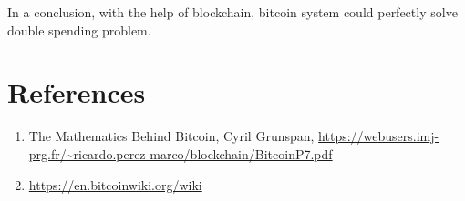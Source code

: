 \documentclass[12pt,a4paper]{article}
\begin{document}
 In a conclusion, with the help of blockchain, bitcoin system could perfectly solve double spending problem.

\section{References}
\begin{enumerate}
	\item The Mathematics Behind Bitcoin, Cyril Grunspan, \url{https://webusers.imj-prg.fr/~ricardo.perez-marco/blockchain/BitcoinP7.pdf}
	\item \url{https://en.bitcoinwiki.org/wiki}
\end{enumerate}
\end{document}
